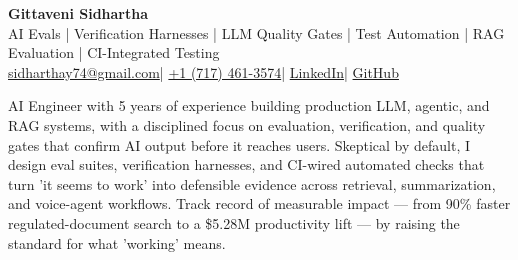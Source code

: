 \documentclass[letterpaper,9.5pt]{article}
\newcommand{\resumeSection}[1]{%
  \vspace{3pt}\noindent{\large\bfseries\color{linkblue}#1}\par
  \vspace{-3pt}\noindent{\color{linkblue}\rule{\textwidth}{0.45pt}}\vspace{1pt}%
}
\begin{document}
\begin{center}
  {\Huge\bfseries Gittaveni Sidhartha}\\[2pt]
  {\large AI Evals | Verification Harnesses | LLM Quality Gates | Test Automation | RAG Evaluation | CI-Integrated Testing}\\[4pt]
  {\small
    \href{mailto:sidharthay74@gmail.com}{sidharthay74@gmail.com}\enspace|\enspace
    \href{tel:+17174613574}{+1 (717) 461-3574}\enspace|\enspace
    \href{https://www.linkedin.com/in/sidharthay74/}{LinkedIn}\enspace|\enspace
    \href{https://github.com/zentrium74}{GitHub}
  }
\end{center}
\vspace{-3pt}

\resumeSection{Summary}
AI Engineer with 5 years of experience building production LLM, agentic, and RAG systems, with a disciplined focus on evaluation, verification, and quality gates that confirm AI output before it reaches users. Skeptical by default, I design eval suites, verification harnesses, and CI-wired automated checks that turn 'it seems to work' into defensible evidence across retrieval, summarization, and voice-agent workflows. Track record of measurable impact --- from 90\% faster regulated-document search to a \$5.28M productivity lift --- by raising the standard for what 'working' means.
\end{document}
